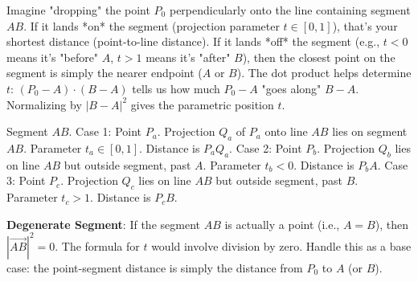 \begin{intuition}
\label{intuition:A.1.3.point_segment_dist}
Imagine "dropping" the point $P_0$ perpendicularly onto the line containing segment $AB$.
If it lands *on* the segment (projection parameter $t \in [0,1]$), that's your shortest distance (point-to-line distance).
If it lands *off* the segment (e.g., $t<0$ means it's "before" $A$, $t>1$ means it's "after" $B$), then the closest point on the segment is simply the nearer endpoint ($A$ or $B$).
The dot product helps determine $t$: $(P_0-A)\cdot(B-A)$ tells us how much $P_0-A$ "goes along" $B-A$. Normalizing by $|B-A|^2$ gives the parametric position $t$.
\end{intuition}

\begin{visualexample}
\label{vis:A.1.3.point_segment_dist}
Segment $AB$.
Case 1: Point $P_a$. Projection $Q_a$ of $P_a$ onto line $AB$ lies on segment $AB$. Parameter $t_a \in [0,1]$. Distance is $P_aQ_a$.
Case 2: Point $P_b$. Projection $Q_b$ lies on line $AB$ but outside segment, past $A$. Parameter $t_b < 0$. Distance is $P_bA$.
Case 3: Point $P_c$. Projection $Q_c$ lies on line $AB$ but outside segment, past $B$. Parameter $t_c > 1$. Distance is $P_cB$.
\end{visualexample}

\begin{warning}
\label{warn:A.1.3.segment_is_point}
\textbf{Degenerate Segment}: If the segment $AB$ is actually a point (i.e., $A=B$), then $|\vec{AB}|^2 = 0$. The formula for $t$ would involve division by zero. Handle this as a base case: the point-segment distance is simply the distance from $P_0$ to $A$ (or $B$).
\end{warning}